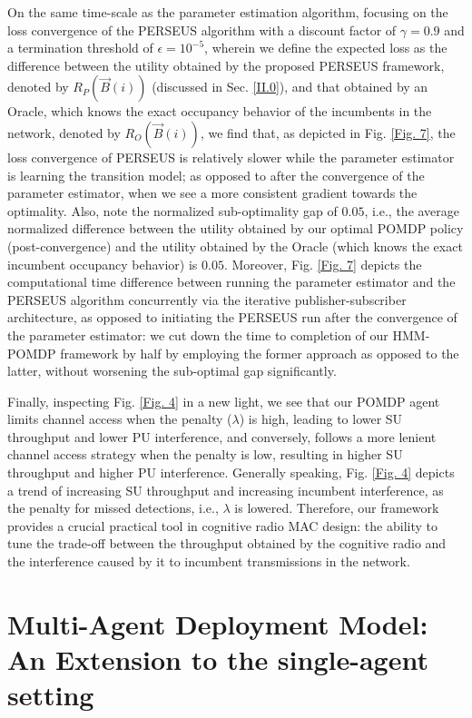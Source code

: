 \documentclass[12pt, draftcls, onecolumn]{IEEEtran}
\begin{document}
On the same time-scale as the parameter estimation algorithm, focusing on the loss convergence of the PERSEUS algorithm with a discount factor of $\gamma{=}0.9$ and a termination threshold of $\epsilon{=}10^{-5}$, wherein we define the expected loss as the difference between the utility obtained by the proposed PERSEUS framework, denoted by $R_{P}(\vec{B}(i))$ (discussed in Sec. \ref{II.0}), and that obtained by an Oracle, which knows the exact occupancy behavior of the incumbents in the network, denoted by $R_{O}(\vec{B}(i))$, we find that, as depicted in Fig. \ref{Fig. 7}, the loss convergence of PERSEUS is relatively slower while the parameter estimator is learning the transition model; as opposed to after the convergence of the parameter estimator, when we see a more consistent gradient towards the optimality. Also, note the normalized sub-optimality gap of $0.05$, i.e., the average normalized difference between the utility obtained by our optimal POMDP policy (post-convergence) and the utility obtained by the Oracle (which knows the exact incumbent occupancy behavior) is $0.05$. Moreover, Fig. \ref{Fig. 7} depicts the computational time difference between running the parameter estimator and the PERSEUS algorithm concurrently via the iterative publisher-subscriber architecture, as opposed to initiating the PERSEUS run after the convergence of the parameter estimator: we cut down the time to completion of our HMM-POMDP framework by half by employing the former approach as opposed to the latter, without worsening the sub-optimal gap significantly.

Finally, inspecting Fig. \ref{Fig. 4} in a new light, we see that our POMDP agent limits channel access when the penalty ($\lambda$) is high, leading to lower SU throughput and lower PU interference, and conversely, follows a more lenient channel access strategy when the penalty is low, resulting in higher SU throughput and higher PU interference. Generally speaking, Fig. \ref{Fig. 4} depicts a trend of increasing SU throughput and increasing incumbent interference, as the penalty for missed detections, i.e., $\lambda$ is lowered. Therefore, our framework provides a crucial practical tool in cognitive radio MAC design: the ability to tune the trade-off between the throughput obtained by the cognitive radio and the interference caused by it to incumbent transmissions in the network.

\section{Multi-Agent Deployment Model: An Extension to the single-agent setting}\label{Z}
\end{document}
